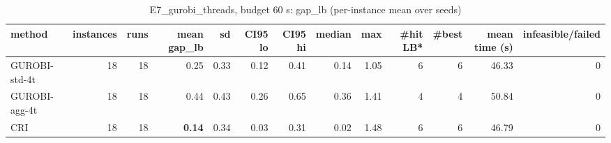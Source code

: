 \begin{table}[htbp]
\centering
\small
\caption{E7\_gurobi\_threads, budget 60 s: gap\_lb (per-instance mean over seeds)}
\label{tab:E7_gurobi_threads_b60_summary}
\begin{tabular}{lrrrrrrrrrrrr}
\toprule
method & instances & runs & mean gap\_lb & sd & CI95 lo & CI95 hi & median & max & \#hit LB* & \#best & mean time (s) & infeasible/failed \\
\midrule
GUROBI-std-4t & 18 & 18 & 0.25 & 0.33 & 0.12 & 0.41 & 0.14 & 1.05 & 6 & 6 & 46.33 & 0 \\
GUROBI-agg-4t & 18 & 18 & 0.44 & 0.43 & 0.26 & 0.65 & 0.36 & 1.41 & 4 & 4 & 50.84 & 0 \\
CRI & 18 & 18 & \textbf{0.14} & 0.34 & 0.03 & 0.31 & 0.02 & 1.48 & 6 & 6 & 46.79 & 0 \\
\bottomrule
\end{tabular}
\end{table}
